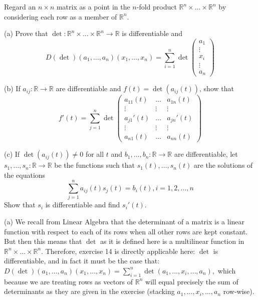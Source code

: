 \begin{exercise}{15}
    Regard an $n \times n$ matrix as a point in the $n$-fold product $\mathbb{R}^n \times \ldots \times \mathbb{R}^n$ by considering each row as a member of $\mathbb{R}^n$.

    (a) Prove that $\det: \mathbb{R}^n \times \ldots \times \mathbb{R}^n \rightarrow \mathbb{R}$ is differentiable and
    $$D(\det)(a_1, \ldots, a_n)(x_1, \ldots, x_n) = \sum_{i=1}^{n} \det \begin{pmatrix}
        a_1 \\ \vdots \\ x_i \\ \vdots \\ a_n
    \end{pmatrix}$$

    (b) If $a_{ij}: \mathbb{R} \rightarrow \mathbb{R}$ are differentiable and $f(t) = \det(a_{ij}(t))$, show that
    $$f'(t) = \sum_{j=1}^{n} \det \begin{pmatrix}
        a_{11}(t) & \ldots & a_{1n}(t) \\
        \vdots & \vdots & \vdots \\
        a_{j1}'(t) & \ldots & a_{jn}'(t) \\
        \vdots & \vdots & \vdots \\
        a_{n1}(t) & \ldots & a_{nn}(t)
    \end{pmatrix}$$

    (c) If $\det(a_{ij}(t)) \neq 0$ for all $t$ and $b_1, \ldots, b_n: \mathbb{R} \rightarrow \mathbb{R}$ are differentiable, let $s_1, \ldots, s_n: \mathbb{R} \rightarrow \mathbb{R}$ be the functions such that $s_1(t), \ldots, s_n(t)$ are the solutions of the equations
    $$\sum_{j=1}^{n} a_{ij}(t)s_j(t) = b_i(t), i = 1, 2, \ldots, n$$
    Show that $s_i$ is differentiable and find $s_i'(t)$.
\end{exercise}

(a) We recall from Linear Algebra that the determinant of a matrix is a linear function with respect to each of its rows when all other rows are kept constant.
But then this means that $\det$ as it is defined here is a multilinear function in $\mathbb{R}^n \times \ldots \times \mathbb{R}^n$.
Therefore, exercise 14 is directly applicable here: $\det$ is differentiable, and in fact it must be the case that:
$D(\det)(a_1, \ldots, a_n)(x_1, \ldots, x_n) = \sum_{i=1}^{n} \det (a_1, \ldots, x_i, \ldots, a_n),$
which because we are treating rows as vectors of $\mathbb{R}^n$ will equal precisely the sum of determinants as they are given in the exercise (stacking $a_1, \ldots, x_i, \ldots, a_n$ row-wise).

